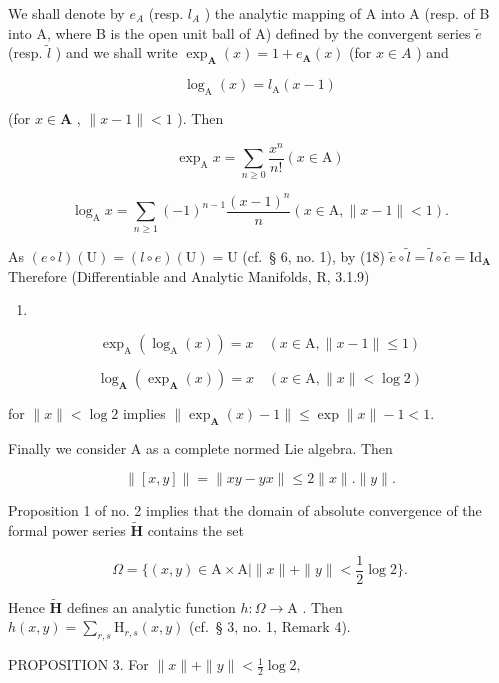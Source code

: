 We shall denote by \(e_{A}\) (resp. \(l_{A}\) ) the analytic mapping of A into A (resp. of B into A, where B is the open unit ball of A) defined by the convergent series \(\tilde{e}\) (resp. \(\tilde{l}\) ) and we shall write \(\exp_{\mathbf{A}}(x)=1+e_{\mathbf{A}}(x)\) (for \(x\in A\) ) and

\[
\log_ {\mathrm{A}} (x) = l _ {\mathrm{A}} (x - 1)
\]

(for \(x \in \mathbf{A}\) , \(\| x - 1\| < 1\) ). Then

\[
\exp_ {\mathrm{A}} x = \sum_ {n \geqslant 0} \frac {x ^ {n}}{n !} (x \in \mathrm{A})\tag{19}
\]

\[
\log_ {\mathrm{A}} x = \sum_ {n \geqslant 1} (- 1) ^ {n - 1} \frac {(x - 1) ^ {n}}{n} (x \in \mathrm{A}, \| x - 1 \| <   1).\tag{20}
\]

As \((e\circ l)(\mathrm{U}) = (l\circ e)(\mathrm{U}) = \mathrm{U}\) (cf.~§ 6, no. 1), by (18) \(\tilde{e}\circ \tilde{l} = \tilde{l}\circ \tilde{e} = \mathrm{Id}_{\mathbf{A}}\) Therefore (Differentiable and Analytic Manifolds, R, 3.1.9)

\begin{enumerate}
\def\labelenumi{(\arabic{enumi})}
\setcounter{enumi}{20}
\tightlist
\item
\end{enumerate}

\[
\exp_ {\mathrm{A}} (\log_ {\mathrm{A}} (x)) = x \quad (x \in \mathrm{A}, \| x - 1 \| \leqslant 1)\tag{21}
\]

\[
\log_ {\mathbf {A}} (\exp_ {\mathbf {A}} (x)) = x \quad (x \in \mathrm{A}, \| x \| <   \log 2)\tag{22}
\]

for \(\| x\| < \log 2\) implies \(\| \exp_{\mathbf{A}}(x) - 1\| \leqslant \exp \| x\| -1 < 1.\)

Finally we consider A as a complete normed Lie algebra. Then

\[
\| [ x, y ] \| = \| x y - y x \| \leqslant 2 \| x \|. \| y \|.
\]

Proposition 1 of no. 2 implies that the domain of absolute convergence of the formal power series \(\tilde{\mathbf{H}}\) contains the set

\[
\Omega = \{(x, y) \in \mathrm{A} \times \mathrm{A} | \| x \| + \| y \| <   \frac {1}{2} \log 2 \}.
\]

Hence \(\tilde{\mathbf{H}}\) defines an analytic function \(h\colon \Omega \to \mathrm{A}\) . Then \(h(x,y) = \sum_{r,s}\mathrm{H}_{r,s}(x,y)\) (cf.~§ 3, no. 1, Remark 4).

PROPOSITION 3. For \(\| x\| + \| y\| < \frac{1}{2}\log 2,\)

